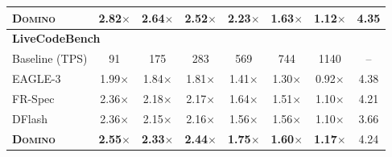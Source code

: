 \begin{table}[t]
{\begin{tabular}{l cccccc c}
\textbf{\textsc{Domino}}
& \textbf{2.82$\times$} & \textbf{2.64$\times$} & \textbf{2.52$\times$} & \textbf{2.23$\times$} & \textbf{1.63$\times$} & \textbf{1.12$\times$}
& 4.35 \\

\midrule
\multicolumn{8}{l}{\textbf{LiveCodeBench}} \\
\midrule
Baseline (TPS)
& 91 & 175 & 283 & 569 & 744 & 1140 & -- \\

EAGLE-3
& 1.99$\times$ & 1.84$\times$ & 1.81$\times$ & 1.41$\times$ & 1.30$\times$ & 0.92$\times$
& 4.38 \\

FR-Spec
& 2.36$\times$ & 2.18$\times$ & 2.17$\times$ & 1.64$\times$ & 1.51$\times$ & 1.10$\times$
& 4.21 \\

DFlash
& 2.36$\times$ & 2.15$\times$ & 2.16$\times$ & 1.56$\times$ & 1.56$\times$ & 1.10$\times$
& 3.66 \\

\textbf{\textsc{Domino}}
& \textbf{2.55$\times$} & \textbf{2.33$\times$} & \textbf{2.44$\times$} & \textbf{1.75$\times$} & \textbf{1.60$\times$} & \textbf{1.17$\times$}
& 4.24 \\

\bottomrule
\end{tabular}
}
\end{table}